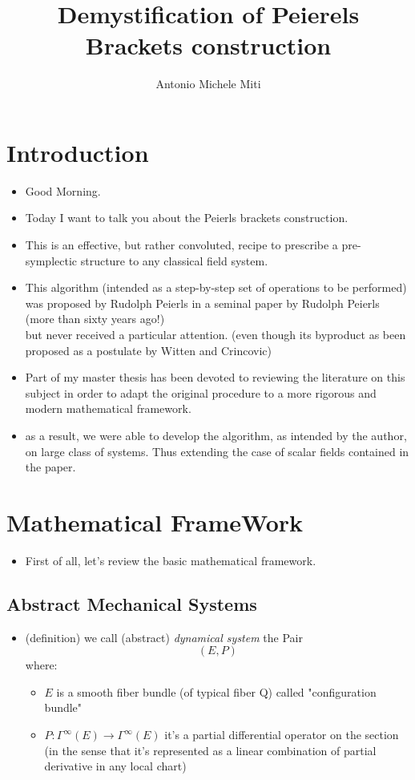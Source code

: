 \documentclass[a4paper,11pt]{scrartcl}
\title{Demystification of Peierels Brackets construction}
\author{Antonio Michele Miti}
\date{\vspace{-5ex}} %
\begin{document}

	\maketitle
	\tableofcontents

	\newpage
	\section{Introduction}
	\begin{itemize}
		\item Good Morning.
		\item Today I want to talk you about the Peierls brackets construction.
		\item This is an effective, but rather convoluted, recipe to prescribe a pre-symplectic structure to any classical field system.
		\item This algorithm (intended as a step-by-step set of operations to be performed) was proposed by Rudolph Peierls in a seminal paper by Rudolph Peierls (more than sixty years ago!) \\
		but never received a particular attention.
		(even though its byproduct as been proposed as a postulate by Witten and Crincovic)
		\item Part of my master thesis has been devoted to reviewing the literature on this subject in order to adapt the original procedure to a more rigorous and modern mathematical framework.
		\item as a result, we were able to develop the algorithm, as intended by the author, on large class of systems.
		Thus extending the case of scalar fields contained in the paper.
	\end{itemize}

	\newpage
	\section{Mathematical FrameWork}
	\begin{itemize}
		\item First of all, let's review the basic mathematical framework.
	\end{itemize}
	\subsection{Abstract Mechanical Systems}
	\begin{itemize}
		\item (definition) we call (abstract) \emph{dynamical system} the Pair $$(E,P)$$ where:
		\begin{itemize}
			\item $E$ is a smooth fiber bundle (of typical fiber Q) called "configuration bundle"
			\item $P: \Gamma^\infty(E) \rightarrow \Gamma^\infty(E)$ it's a partial differential operator on the section\\
			(in the sense that it's represented as a linear combination of partial derivative in any local chart)
		\end{itemize}
	\end{itemize}
\end{document}
